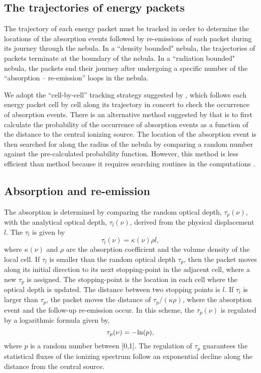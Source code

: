 \documentclass[twocolumn]{aastex62}
\begin{document}
\begin{CJK*}{UTF8}{gbsn}
\subsection{The trajectories of energy packets}

The trajectory of each energy packet must be tracked in order to determine the locations of the absorption events followed by re-emissions of each packet during its journey through the nebula.
In a ``density bounded" nebula, the trajectories of packets terminate at the boundary of the nebula. 
In a ``radiation bounded" nebula, the packets end their journey after undergoing a specific number of the ``absorption -- re-emission'' loops in the nebula.

We adopt the ``cell-by-cell'' tracking strategy suggested by \cite{Lucy-1999}, which follows each energy packet cell by cell along its trajectory in concert to check the occurrence of absorption events. 
There is an alternative method suggested by \cite{Harries-1997} that is to first calculate the probability of the occurrence of absorption events as a function of the distance to the central ionizing source. The location of the absorption event is then searched for along the radius of the nebula by comparing a random number against the pre-calculated probability function.
However, this method is less efficient than \cite{Lucy-1999} method because it requires searching routines in the computations \citep{Ercolano-2003}.


\subsection{Absorption and re-emission}

The absorption is determined by comparing the random optical depth, $\tau_{p}(\nu)$, with the analytical optical depth, $\tau_{l}(\nu)$, derived from the physical displacement $l$.
The $\tau_{l}$ is given by
\begin{equation}\label{eq3}
\tau_{l}(\nu)=\kappa(\nu)\rho l,
\end{equation}
where $\kappa(\nu)$ and $\rho$ are the absorption coefficient and the volume density of the local cell. 
If $\tau_{l}$ is smaller than the random optical depth $\tau_{p}$, then the packet moves along its initial direction to its next stopping-point in the adjacent cell, where a new $\tau_{p}$ is assigned. 
The stopping-point is the location in each cell where the optical depth is updated. 
The distance between two stopping points is $l$.
If $\tau_{l}$ is larger than $\tau_{p}$, the packet moves the distance of $\tau_{p}/(\kappa\rho)$, where the absorption event and the follow-up re-emission occur.
In this scheme, the $\tau_{p}(\nu)$ is regulated by a logarithmic formula given by,
\begin{equation}\label{eq4}
\tau_{p}(\nu)=-{\rm ln}(p),
\end{equation}
where $p$ is a random number between [0,1].
The regulation of $\tau_p$ guarantees the statistical fluxes of the ionizing spectrum follow an exponential decline along the distance from the central source.


\end{CJK*}
\end{document}
